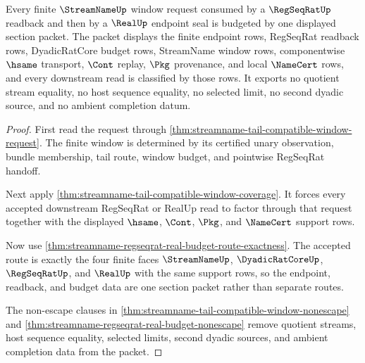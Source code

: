 \begin{theorem}
\label{thm:streamname-regseqrat-window-budget-section}
Every finite $\StreamNameUp$ window request consumed by a $\RegSeqRatUp$
readback and then by a $\RealUp$ endpoint seal is budgeted by one displayed
section packet. The packet displays the finite endpoint rows, RegSeqRat
readback rows, DyadicRatCore budget rows, StreamName window rows,
componentwise $\hsame$ transport, $\Cont$ replay, $\Pkg$ provenance, and
local $\NameCert$ rows, and every downstream read is classified by those rows.
It exports no quotient stream equality, no host sequence equality, no selected
limit, no second dyadic source, and no ambient completion datum.
\end{theorem}
\begin{proof}
First read the request through
\autoref{thm:streamname-tail-compatible-window-request}. The finite window is
determined by its certified unary observation, bundle membership, tail route,
window budget, and pointwise RegSeqRat handoff.

Next apply \autoref{thm:streamname-tail-compatible-window-coverage}. It forces
every accepted downstream RegSeqRat or RealUp read to factor through that
request together with the displayed $\hsame$, $\Cont$, $\Pkg$, and
$\NameCert$ support rows.

Now use \autoref{thm:streamname-regseqrat-real-budget-route-exactness}. The
accepted route is exactly the four finite faces $\StreamNameUp$,
$\DyadicRatCoreUp$, $\RegSeqRatUp$, and $\RealUp$ with the same support rows,
so the endpoint, readback, and budget data are one section packet rather than
separate routes.

The non-escape clauses in
\autoref{thm:streamname-tail-compatible-window-nonescape} and
\autoref{thm:streamname-regseqrat-real-budget-nonescape} remove quotient
streams, host sequence equality, selected limits, second dyadic sources, and
ambient completion data from the packet.
\end{proof}

